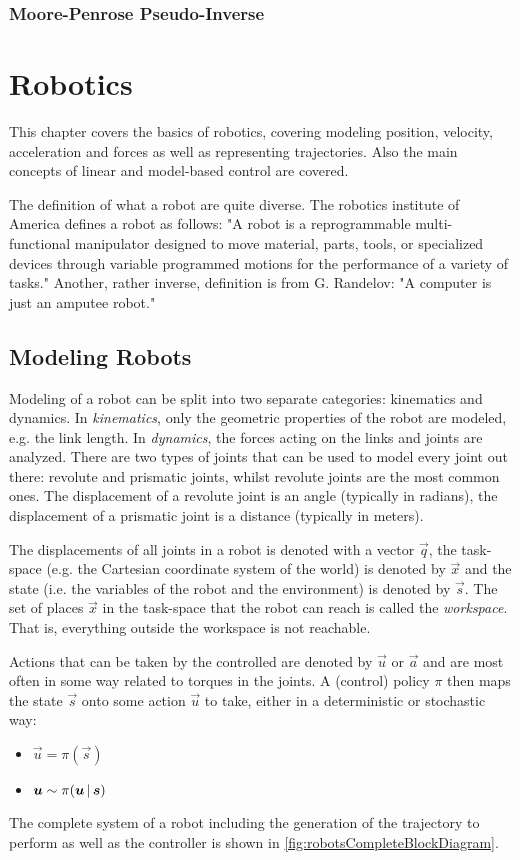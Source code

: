		\subsection{Moore-Penrose Pseudo-Inverse} %

\chapter{Robotics}
	This chapter covers the basics of robotics, covering modeling position, velocity, acceleration and forces as well as representing trajectories. Also the main concepts of linear and model-based control are covered.

	The definition of what a robot are quite diverse. The robotics institute of America defines a robot as follows: "A robot is a reprogrammable multi-functional manipulator designed to move material, parts, tools, or specialized devices through variable programmed motions for the performance of a variety of tasks." Another, rather inverse, definition is from G. Randelov: "A computer is just an amputee robot."

	\section{Modeling Robots}
		Modeling of a robot can be split into two separate categories: kinematics and dynamics. In \emph{kinematics}, only the geometric properties of the robot are modeled, e.g. the link length. In \emph{dynamics}, the forces acting on the links and joints are analyzed. There are two types of joints that can be used to model every joint out there: revolute and prismatic joints, whilst revolute joints are the most common ones. The displacement of a revolute joint is an angle (typically in radians), the displacement of a prismatic joint is a distance (typically in meters).

		The displacements of all joints in a robot is denoted with a vector \(\vec{q}\), the task-space (e.g. the Cartesian coordinate system of the world) is denoted by \(\vec{x}\) and the state (i.e. the variables of the robot and the environment) is denoted by \(\vec{s}\). The set of places \(\vec{x}\) in the task-space that the robot can reach is called the \emph{workspace}. That is, everything outside the workspace is not reachable.

		Actions that can be taken by the controlled are denoted by \(\vec{u}\) or \(\vec{a}\) and are most often in some way related to torques in the joints. A (control) policy \(\pi\) then maps the state \(\vec{s}\) onto some action \(\vec{u}\) to take, either in a deterministic or stochastic way:
		\begin{itemize}
			\item {} \( \vec{u} = \pi(\vec{s}) \)
			\item {}    \( \bm{u} \sim \pi(\bm{u} \,\vert\, \bm{s}) \)
		\end{itemize}
		The complete system of a robot including the generation of the trajectory to perform as well as the controller is shown in \autoref{fig:robotsCompleteBlockDiagram}.

